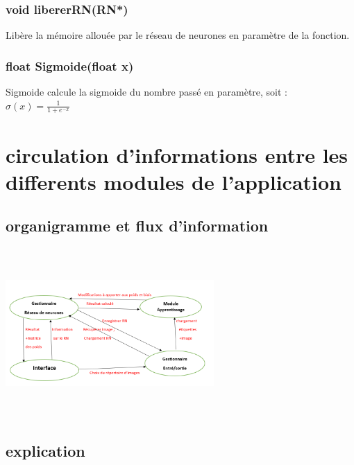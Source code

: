 \documentclass{article}
\begin{document}
		\subsubsection{\textcolor{myblue}{\textbf{void}} libererRN(\textcolor{myblue}{\textbf{RN*}})}
		Libère la mémoire allouée par le réseau de neurones en paramètre de la fonction.
		
		\subsubsection{\textcolor{myblue}{\textbf{float}} Sigmoide(\textcolor{myblue}{\textbf{float}} x)}
		Sigmoide calcule la sigmoide du nombre passé en paramètre, soit : \\
		$\sigma(x) = \frac{1}{1+e^{-x}}$
	\newpage

\section{circulation d'informations entre les differents modules de l'application}
	\subsection{organigramme et flux d'information}
		\begin{center} 

			\includegraphics[height=244, width=300]{pic-min.PNG}

		\end{center}	
	\subsection{explication}
		
\end{document}
